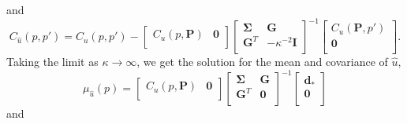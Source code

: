 and
\begin{equation}\label{ch5:eq:PosteriorCov2}
C_{\hat{u}}(p,p') = C_u(p,p') - 
                    \left[\begin{array}{cc}
                          C_u(p,\mathbf{P}) & \mathbf{0} \\
                          \end{array}\right]
                    \left[\begin{array}{cc}
                          \mathbf{\Sigma} & \mathbf{G} \\
                          \mathbf{G}^T  & -\kappa^{-2} \mathbf{I} \\
                          \end{array}\right]^{-1}
                    \left[\begin{array}{c}
                          C_u(\mathbf{P},p') \\
                          \mathbf{0} \\
                          \end{array}\right].
\end{equation}
Taking the limit as $\kappa \to \infty$, we get the solution for the
mean and covariance of $\hat{u}$,
\begin{equation}\label{ch5:eq:PosteriorMean3}
\mu_{\hat{u}}(p) = \left[\begin{array}{cc}
                         C_u(p,\mathbf{P}) & \mathbf{0} \\
                         \end{array}\right]
                   \left[\begin{array}{cc}
                         \mathbf{\Sigma} & \mathbf{G} \\
                         \mathbf{G}^T  & \mathbf{0} \\
                         \end{array}\right]^{-1}
                   \left[\begin{array}{c}
                         \mathbf{d}_* \\
                         \mathbf{0} \\
                         \end{array}\right]
\end{equation}    
and
